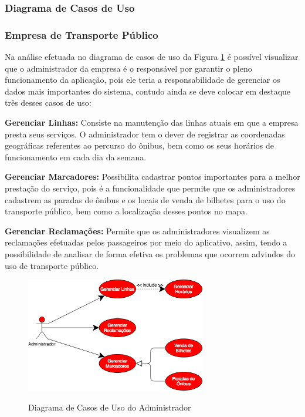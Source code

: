 {{{{\subsubsection{Diagrama de Casos de Uso}

\subsubsection*{Empresa de Transporte Público}

Na análise efetuada no diagrama de casos de uso da Figura \ref{fig:caso-de-uso-administrador} é possível visualizar que o administrador da empresa é o responsável por garantir o pleno funcionamento da aplicação, pois ele teria a responsabilidade de gerenciar os dados mais importantes do sistema, contudo ainda se deve colocar em destaque três desses casos de uso:

\begin{lista}
\item \textbf{Gerenciar Linhas:} Consiste na manutenção das linhas atuais em que a empresa presta seus serviços. O administrador tem o dever de registrar as coordenadas geográficas referentes ao percurso do ônibus, bem como os seus horários de funcionamento em cada dia da semana.
\item \textbf{Gerenciar Marcadores:} Possibilita cadastrar pontos importantes para a melhor prestação do serviço, pois é a funcionalidade que permite que os administradores cadastrem as paradas de ônibus e os locais de venda de bilhetes para o uso do transporte público, bem como a localização desses pontos no mapa.
\item \textbf{Gerenciar Reclamações:} Permite que os administradores visualizem as reclamações efetuadas pelos passageiros por meio do aplicativo, assim, tendo a possibilidade de analisar de forma efetiva os problemas que ocorrem advindos do uso de transporte público.
\end{lista}

\begin{figure}[H]
\caption{Diagrama de Casos de Uso do Administrador}
\centering
\includegraphics[width=0.7\textwidth]{imagens/caso-de-uso-administrador.png}
\label{fig:caso-de-uso-administrador}
\end{figure}

}}}}
